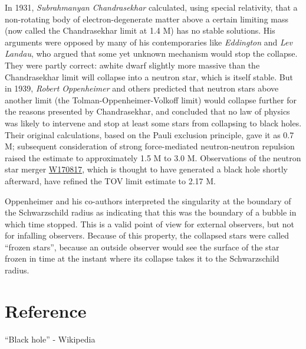\documentclass[twocolumn,12pt]{article}
\begin{document}
In 1931, \textit{Subrahmanyan Chandrasekhar} calculated, using special relativity, that a non-rotating body of electron-degenerate matter above a certain limiting mass (now called the Chandrasekhar limit at 1.4 M) has no stable solutions. His arguments were opposed by many of his contemporaries like \textit{Eddington} and \textit{Lev Landau}, who argued that some yet unknown mechanism would stop the collapse. They were partly correct: awhite dwarf slightly more massive than the Chandrasekhar limit will collapse into a neutron star, which is itself stable. But in 1939, \textit{Robert Oppenheimer} and others predicted that neutron stars above another limit (the Tolman-Oppenheimer-Volkoff limit) would collapse further for the reasons presented by Chandrasekhar, and concluded that no law of physics was likely to intervene and stop at least some stars from collapsing to black holes. Their original calculations, based on the Pauli exclusion principle, gave it as 0.7 M; subsequent consideration of strong force-mediated neutron-neutron repulsion raised the estimate to approximately 1.5 M to 3.0 M. Observations of the neutron star merger \ul{W170817}, which is thought to have generated a black hole shortly afterward, have refined the TOV limit estimate to 2.17 M.

Oppenheimer and his co-authors interpreted the singularity at the boundary of the Schwarzschild radius as indicating that this was the boundary of a bubble in which time stopped. This is a valid point of view for external observers, but not for infalling observers. Because of this property, the collapsed stars were called “frozen stars”, because an outside observer would see the surface of the star frozen in time at the instant where its collapse takes it to the Schwarzschild radius.

\section*{\textbf{Reference}} 
\hspace{1.5cm} “Black hole” - Wikipedia
\end{document}
